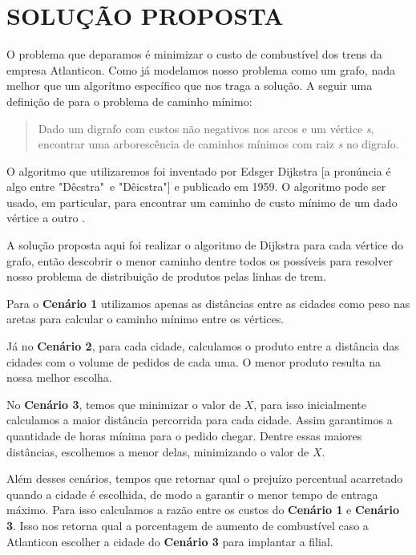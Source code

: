 \documentclass[12pt]{article}
\begin{document}
\section{SOLUÇÃO PROPOSTA}
\label{solucao_proposta}

	O problema que deparamos é minimizar o custo de combustível dos trens da empresa Atlanticon. Como já modelamos nosso problema como um grafo, nada melhor que um algorítmo específico que nos traga a solução. A seguir uma definição de \cite{sedgewick} para o problema de caminho mínimo:

	\begin{quote}
	Dado um digrafo com custos não negativos nos arcos e um vértice \textit{s}, encontrar uma arborescência de caminhos mínimos com raiz \textit{s} no digrafo.
	\end{quote}

	O algoritmo que utilizaremos foi inventado por Edsger Dijkstra [a pronúncia é algo entre "Dêcstra"\ e "Dêicstra"] e publicado em 1959. O algoritmo pode ser usado, em particular, para encontrar um caminho de custo mínimo de um dado vértice a outro \cite{sedgewick}.

	A solução proposta aqui foi realizar o algoritmo de Dijkstra para cada vértice do grafo, então descobrir o menor caminho dentre todos os possíveis para resolver nosso problema de distribuição de produtos pelas linhas de trem.

	Para o \textbf{Cenário 1} utilizamos apenas as distâncias entre as cidades como peso nas aretas para calcular o caminho mínimo entre os vértices.

	Já no \textbf{Cenário 2}, para cada cidade, calculamos o produto entre a distância das cidades com o volume de pedidos de cada uma. O menor produto resulta na nossa melhor escolha.

	No \textbf{Cenário 3}, temos que minimizar o valor de $X$, para isso inicialmente calculamos a maior distância percorrida para cada cidade. Assim garantimos a quantidade de horas mínima para o pedido chegar. Dentre essas maiores distâncias, escolhemos a menor delas, minimizando o valor de $X$.

	Além desses cenários, tempos que retornar qual o prejuízo percentual acarretado quando a cidade é escolhida, de modo a garantir o menor tempo de entraga máximo. Para isso calculamos a razão entre os custos do \textbf{Cenário 1} e \textbf{Cenário 3}. Isso nos retorna qual a porcentagem de aumento de combustível caso a Atlanticon escolher a cidade do \textbf{Cenário 3} para implantar a filial.
\end{document}

